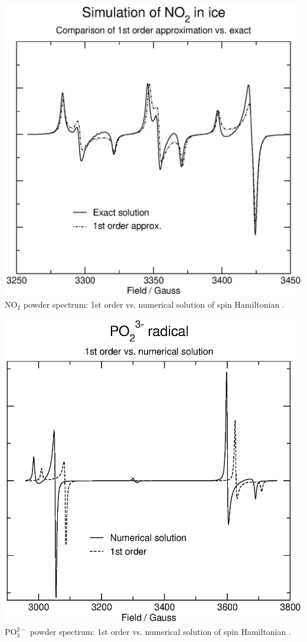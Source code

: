 \documentclass[byrevtex,amssymb,aps,pra,floatfix,letterpaper]{revtex4}
\begin{document}
\begin{center}
\includegraphics*[scale=0.4]{fig14}\\
NO$_2$ powder spectrum: 1st order vs. numerical solution of spin Hamiltonian \cite{symons}.
\end{center}

\begin{center}
\includegraphics*[scale=0.35]{fig15}\\
PO$_3^{2-}$ powder spectrum: 1st order vs. numerical solution of spin Hamiltonian \cite{morton}.
\end{center}
\end{document}
